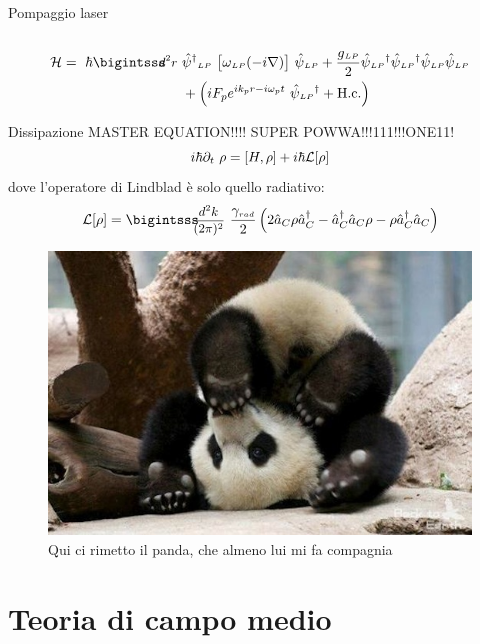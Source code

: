 \documentclass[10pt]{beamer}
\begin{document}
\begin{frame}{Pompaggio laser}
{\begin{columns}
\end{columns}
}
\normalsize
\begin{align*}
  \ham = \ \hbar \intr & \opsi^\dagger\lp \ \big[ \omega\lp(-i\nabla) \big]\ \opsi\lp + \frac{g\lp}{2} \opsi\lp^\dagger  \opsi\lp^\dagger  \opsi\lp  \opsi\lp \\
	&+ \left( i F_p e^{ik_p r -i\omega_p t} \ \opsi\lp^\dagger + \hc \right)
\end{align*}

\end{frame}


\begin{frame}{Dissipazione}
MASTER EQUATION!!!! \alert{SUPER POWWA}!!!111!!!ONE11!
{\Large
\begin{equation*}
i\hbar \partial_t\ \rho = [H,\rho] + i\hbar \mathcal{L}[\rho]
\end{equation*}
}
dove l'operatore di Lindblad è solo quello radiativo:
\begin{equation*}
\lind \rho = \intk \frac{\gamma_{{\scriptscriptstyle rad}}}{2} \left ( 2\oa_C\rho \oa_C^\dagger - \oa_C^\dagger \oa_C \rho - \rho \oa_C^\dagger \oa_C \right )
\end{equation*}

\begin{figure}
       \includegraphics[scale=.3]{files/Panda.jpg}
       \caption{\footnotesize Qui ci rimetto il panda, che almeno lui mi fa compagnia}
      \end{figure}
 
\end{frame}


\section{Teoria di campo medio}
\end{document}
